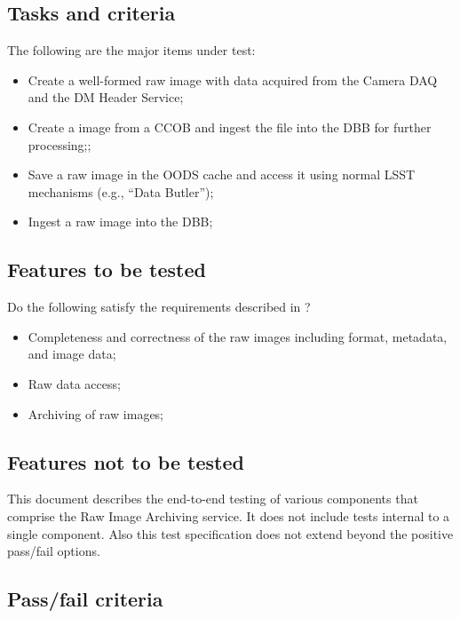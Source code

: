 \documentclass[DM,lsstdraft,STS,toc]{lsstdoc}
\begin{document}
\subsection{Tasks and criteria}
\label{sec:tasks}


The following are the major items under test:


\begin{itemize}
\item{Create a well-formed raw image with data acquired from the Camera DAQ and the DM Header Service; }
\item{Create a image from a CCOB  and ingest the file into the DBB for further processing;; }
\item{Save a raw image in the OODS cache and access it using normal LSST mechanisms (e.g., ``Data Butler''); }
\item{Ingest a raw image into the DBB; }
\end{itemize}




\subsection{Features to be tested}
\label{sec:feat2test}


Do the following satisfy the requirements described in ?
\begin{itemize}
\item{Completeness and correctness of the raw images including format, metadata, and image data;}
\item{Raw data access;}
\item{Archiving of raw images;}
\end{itemize}


\subsection{Features not to be tested}
\label{sec:featnot2test}


This document describes the end-to-end testing of various components
that comprise the Raw Image Archiving service. It does not include tests internal to
a single component. Also this test specification does not
extend beyond the positive pass/fail options.

\subsection{Pass/fail criteria}
\label{sec:passfail}
\end{document}
